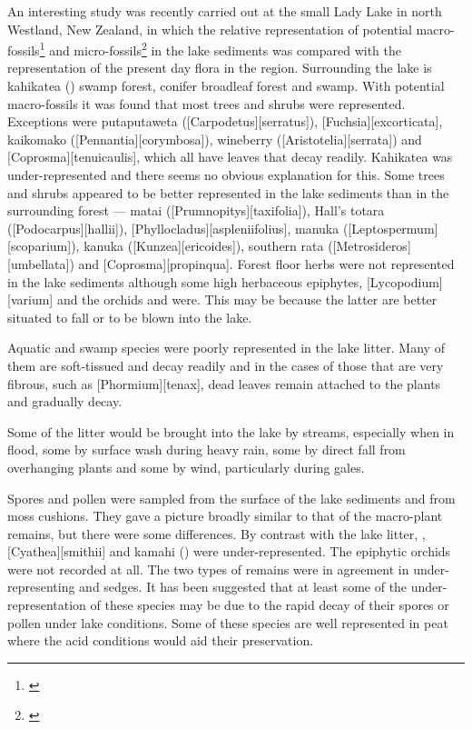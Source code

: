An interesting study was recently carried out at the small Lady Lake in north Westland, New Zealand, in which the relative representation of potential macro-fossils\footnote{\cite{drake1980influx}} and micro-fossils\footnote{\cite{pocknall1980modern}} in the lake sediments was compared with the representation of the present day flora in the region.
Surrounding the lake is kahikatea () swamp forest, conifer broadleaf forest and swamp.
With potential macro-fossils it was found that most trees and shrubs were represented.
Exceptions were putaputaweta ([Carpodetus][serratus]),  [Fuchsia][excorticata], kaikomako ([Pennantia][corymbosa]), wineberry ([Aristotelia][serrata]) and [Coprosma][tenuicaulis], which all have leaves that decay readily.
Kahikatea was under-represented and there seems no obvious explanation for this.
Some trees and shrubs appeared to be better represented in the lake sediments than in the surrounding forest --- matai ([Prumnopitys][taxifolia]), Hall's totara ([Podocarpus][hallii]), [Phyllocladus][aspleniifolius], manuka ([Leptospermum][scoparium]), kanuka ([Kunzea][ericoides]), southern rata ([Metrosideros][umbellata]) and [Coprosma][propinqua].
Forest floor herbs were not represented in the lake sediments although some high herbaceous epiphytes, [Lycopodium][varium] and the orchids  and  were.
This may be because the latter are better situated to fall or to be blown into the lake.

Aquatic and swamp species were poorly represented in the lake litter.
Many of them are soft-tissued and decay readily and in the cases of those that are very fibrous, such as [Phormium][tenax], dead leaves remain attached to the plants and gradually decay.

Some of the litter would be brought into the lake by streams, especially when in flood, some by surface wash during heavy rain, some by direct fall from overhanging plants and some by wind, particularly during gales.

Spores and pollen were sampled from the surface of the lake sediments and from moss cushions.
They gave a picture broadly similar to that of the macro-plant remains, but there were some differences.
By contrast with the lake litter, ,  [Cyathea][smithii] and kamahi () were under-represented.
The epiphytic orchids were not recorded at all.
The two types of remains were in agreement in under-representing  and sedges.
It has been suggested that at least some of the under-representation of these species may be due to the rapid decay of their spores or pollen under lake conditions.
Some of these species are well represented in peat where the acid conditions would aid their preservation.


